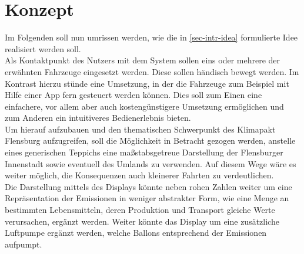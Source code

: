 \documentclass[.../Dokumentation.tex]{subfiles}
\begin{document}
\section{Konzept}\label{sec-concept}
Im Folgenden soll nun umrissen werden, wie die in \ref{sec-intr-idea} 
formulierte Idee realisiert werden soll.\\
Als Kontaktpunkt des Nutzers mit dem System sollen eins oder mehrere 
der erwähnten Fahrzeuge eingesetzt werden. Diese sollen händisch bewegt werden. 
Im Kontrast hierzu stünde eine Umsetzung, in der die Fahrzeuge zum Beispiel mit 
Hilfe einer App fern gesteuert werden können.
Dies soll zum Einen eine einfachere, vor allem aber auch kostengünstigere 
Umsetzung ermöglichen und zum Anderen ein intuitiveres Bedienerlebnis bieten.\\
Um hierauf aufzubauen und den thematischen Schwerpunkt des Klimapakt Flensburg 
aufzugreifen, soll die Möglichkeit in Betracht gezogen werden, anstelle 
eines generischen Teppichs eine maßstabsgetreue Darstellung der Flensburger 
Innenstadt sowie eventuell des Umlands zu verwenden.
Auf diesem Wege wäre es weiter möglich, die Konsequenzen auch kleinerer Fahrten 
zu verdeutlichen.\\
Die Darstellung mittels des Displays könnte neben rohen Zahlen weiter um eine 
Repräsentation der Emissionen in weniger abstrakter Form, wie eine Menge 
an bestimmten Lebensmitteln, deren Produktion und Transport gleiche Werte 
verursachen, ergänzt werden.
Weiter könnte das Display um eine zusätzliche Luftpumpe ergänzt werden, 
welche Ballons entsprechend der Emissionen aufpumpt.
\end{document}
